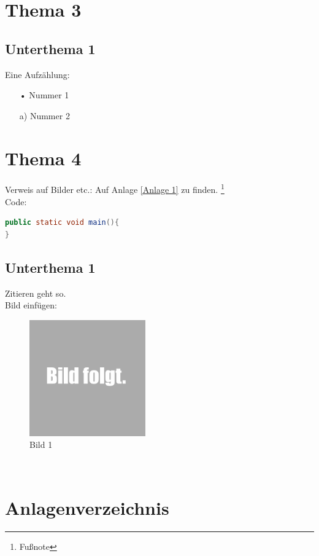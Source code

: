 \documentclass[12pt,a4paper]{scrartcl}
\begin{document}
\section{Thema 3}

\subsection{Unterthema 1}
Eine Aufzählung:\\
\begin{enumerate}
\item[•]Nummer 1
\item[a)]Nummer 2
\end{enumerate}

\newpage
\section{Thema 4}
Verweis auf Bilder etc.: Auf Anlage \ref{Anlage 1} zu finden. \footnote{Fußnote}\\
Code:
\begin{lstlisting}[language=Java, caption=Codeblock 1, style=mystyle, firstnumber=1]
public static void main(){
}
\end{lstlisting}
\subsection{Unterthema 1}
Zitieren geht so. \cite{Test1}\\
Bild einfügen:
\begin{figure}[h]
 \centering
 \includegraphics[width=5cm]{src/bild1.png}
 \caption{Bild 1}
\end{figure}\\

\newpage
	\setcounter{page}{5}
	
	{}


\newpage
	
	\section{Anlagenverzeichnis}
\end{document}

